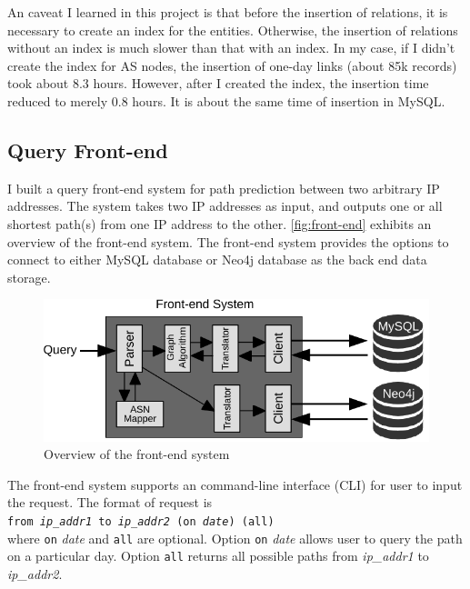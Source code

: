 \documentclass[letterpaper,twocolumn,11pt]{article}
\begin{document}
{An caveat I learned in this project is that before the insertion of relations, it is necessary to create an index for the entities. Otherwise, the insertion of relations without an index is much slower than that with an index. In my case, if I didn't create the index for AS nodes, the insertion of one-day links (about 85k records) took about 8.3 hours. However, after I created the index, the insertion time reduced to merely 0.8 hours. It is about the same time of insertion in MySQL.

\subsection{Query Front-end}

I built a query front-end system for path prediction between two arbitrary IP addresses. The system takes two IP addresses as input, and outputs one or all shortest path(s) from one IP address to the other. \autoref{fig:front-end} exhibits an overview of the front-end system. The front-end system provides the options to connect to either MySQL database or Neo4j database as the back end data storage. 

\begin{figure}[t]
\includegraphics[width=\linewidth]{figs/front_end.pdf}
\caption{Overview of the front-end system}
\label{fig:front-end}
\end{figure}

The front-end system supports an command-line interface (CLI) for user to input the request. The format of request is 
\vspace{6pt}\\
\-\hspace{15pt}
{\tt from {\it ip\_addr1} to {\it ip\_addr2} (on {\it date}) (all)}
\vspace{6pt}\\
where {\tt on} {\it date} and {\tt all} are optional. Option {\tt on} {\it date} allows user to query the path on a particular day. Option {\tt all} returns all possible paths from {\it ip\_addr1} to {\it ip\_addr2}.

}
\end{document}
